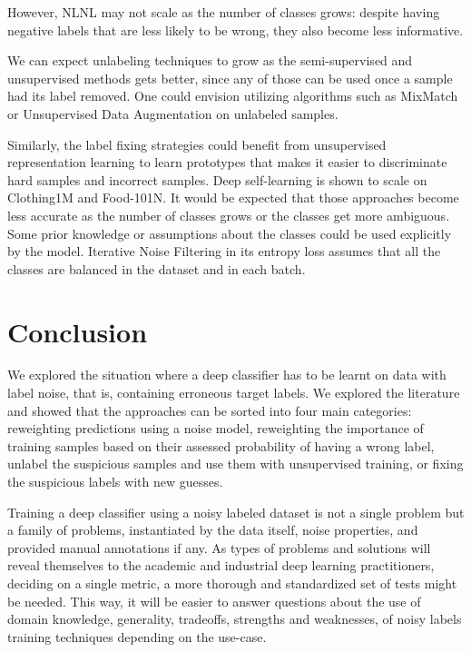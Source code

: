However, NLNL \citep{NLNL} may not scale as the number of classes grows: despite having negative labels that are less likely to be wrong, they also become less informative. 

We can expect unlabeling techniques to grow as the semi-supervised and unsupervised methods gets better, since any of those can be used once a sample had its label removed. One could envision utilizing algorithms such as MixMatch \citep{MixMatch} or Unsupervised Data Augmentation \citep{UDA} on unlabeled samples.

Similarly, the label fixing strategies could benefit from unsupervised representation learning to learn prototypes that makes it easier to discriminate hard samples and incorrect samples. Deep self-learning \citep{SelfLearning} is shown to scale on Clothing1M and Food-101N. It would be expected that those approaches become less accurate as the number of classes grows or the classes get more ambiguous. Some prior knowledge or assumptions about the classes could be used explicitly by the model. Iterative Noise Filtering \citep{IterativeNoiseFiltering} in its entropy loss assumes that all the classes are balanced in the dataset and in each batch.

\section{Conclusion}

We explored the situation where a deep classifier has to be learnt on data with label noise, that is, containing erroneous target labels. We explored the literature and showed that the approaches can be sorted into four main categories: reweighting predictions using a noise model, reweighting the importance of training samples based on their assessed probability of having a wrong label, unlabel the suspicious samples and use them with unsupervised training, or fixing the suspicious labels with new guesses.

Training a deep classifier using a noisy labeled dataset is not a single problem but a family of problems, instantiated by the data itself, noise properties, and provided manual annotations if any. As types of problems and solutions will reveal themselves to the academic and industrial deep learning practitioners, deciding on a single metric, a more thorough and standardized set of tests might be needed. This way, it will be easier to answer questions about the use of domain knowledge, generality, tradeoffs, strengths and weaknesses, of noisy labels training techniques depending on the use-case.

